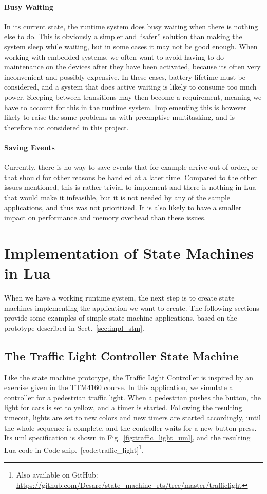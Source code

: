 \paragraph{Busy Waiting} In its current state, the runtime system does busy waiting when there is nothing else to do. This is obviously a simpler and ``safer'' solution than making the system sleep while waiting, but in some cases it may not be good enough. When working with embedded systems, we often want to avoid having to do maintenance on the devices after they have been activated, because its often very inconvenient and possibly expensive. In these cases, battery lifetime must be considered, and a system that does active waiting is likely to consume too much power. Sleeping between transitions may then become a requirement, meaning we have to account for this in the runtime system. Implementing this is however likely to raise the same problems as with preemptive multitasking, and is therefore not considered in this project.

\paragraph{Saving Events} Currently, there is no way to save events that for example arrive out-of-order, or that should for other reasons be handled at a later time. Compared to the other issues mentioned, this is rather trivial to implement and there is nothing in Lua that would make it infeasible, but it is not needed by any of the sample applications, and thus was not prioritized. It is also likely to have a smaller impact on performance and memory overhead than these issues.

\section{Implementation of State Machines in Lua}
\label{sec:impl_state_machines}
When we have a working runtime system, the next step is to create state machines implementing the application we want to create. The following sections provide some examples of simple state machine applications, based on the prototype described in Sect.~\ref{sec:impl_stm}.

\subsection{The Traffic Light Controller State Machine}
\label{sec:impl_traffic_light}
Like the state machine prototype, the Traffic Light Controller is inspired by an exercise given in the TTM4160 course. In this application, we simulate a controller for a pedestrian traffic light. When a pedestrian pushes the button, the light for cars is set to yellow, and a timer is started. Following the resulting timeout, lights are set to new colors and new timers are started accordingly, until the whole sequence is complete, and the controller waits for a new button press. Its \gls{uml} specification is shown in Fig.~\ref{fig:traffic_light_uml}, and the resulting Lua code in Code snip.~\ref{code:traffic_light}\footnote{Also available on GitHub: \url{https://github.com/Desarc/state_machine_rts/tree/master/trafficlight}}.

